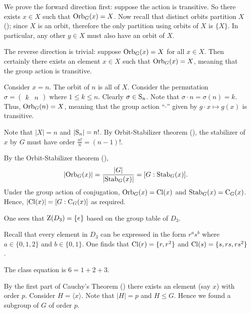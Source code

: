 \begin{questions}
    \item We prove the forward direction first: suppose the action is transitive. So there exists $x \in X$ such that $\mathrm{Orb}_{G}(x) = X$. Now recall that distinct orbits partition $X$ (); since $X$ is an orbit, therefore the only partition using orbits of $X$ is $\{X\}$. In particular, any other $y \in X$ must also have an orbit of $X$.

    The reverse direction is trivial: suppose $\mathrm{Orb}_{G}(x) = X$ for all $x \in X$. Then certainly there exists an element $x \in X$ such that $\mathrm{Orb}_{G}(x) = X$, meaning that the group action is transitive.

    \item \begin{partquestions}{\alph*}
        \item Consider $x = n$. The orbit of $n$ is all of $X$. Consider the permutation $\sigma = \begin{pmatrix}k & n\end{pmatrix}$ where $1 \leq k \leq n$. Clearly $\sigma \in \mathrm{S}_{n}$. Note that $\sigma \cdot n = \sigma(n) = k$. Thus, $\mathrm{Orb}_{G}(n) = X$, meaning that the group action ``$\cdot$'' given by $g \cdot x \mapsto g(x)$ is transitive.
        \item Note that $|X| = n$ and $|\mathrm{S}_{n}| = n!$. By Orbit-Stabilizer theorem (), the stabilizer of $x$ by $G$ must have order $\frac{n!}{n} = (n-1)!$.
    \end{partquestions}

    \item By the Orbit-Stabilizer theorem (),
    \[
        |\mathrm{Orb}_{G}(x)| = \frac{|G|}{|\mathrm{Stab}_{G}(x)|} = [G : \mathrm{Stab}_{G}(x)].
    \]
    Under the group action of conjugation, $\mathrm{Orb}_{G}(x) = \mathrm{Cl}(x)$ and $\mathrm{Stab}_{G}(x) = \mathrm{C}_{G}(x)$. Hence, $|\mathrm{Cl}(x)| = [G : \mathrm{C}_{G}(x)]$ as required.

    \item \begin{partquestions}{\alph*}
        \item One sees that $\mathrm{Z}(D_3) = \{e\}$ based on the group table of $D_3$.
        \item Recall that every element in $D_3$ can be expressed in the form $r^as^b$ where $a \in \{0, 1, 2\}$ and $b \in \{0, 1\}$. One finds that $\mathrm{Cl}(r) = \{r, r^2\}$ and $\mathrm{Cl}(s) = \{s, rs, rs^2\}$.
        \item The class equation is $6 = 1 + 2 + 3$.
    \end{partquestions}

    \item By the first part of Cauchy's Theorem () there exists an element (say $x$) with order $p$. Consider $H = \langle x \rangle$. Note that $|H| = p$ and $H \leq G$. Hence we found a subgroup of $G$ of order $p$.
\end{questions}
